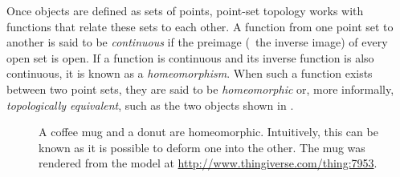 Once objects are defined as sets of points, point-set topology works with functions that relate these sets to each other.
A function from one point set to another is said to be \emph{continuous} if the preimage (\ie\ the inverse image) of every open set is open.
If a function is continuous and its inverse function is also continuous, it is known as a \emph{homeomorphism}.
When such a function exists between two point sets, they are said to be \emph{homeomorphic} or, more informally, \emph{topologically equivalent}, such as the two objects shown in .

\begin{figure}[b]
\centering
{} \quad
{}
\caption[A coffee mug and a donut are homeomorphic]{A coffee mug and a donut are homeomorphic\protect\footnotemark.
Intuitively, this can be known as it is possible to deform one into the other.
The mug was rendered from the model at \url{http://www.thingiverse.com/thing:7953}.}
\label{fig:homeomorphism}
\end{figure}
